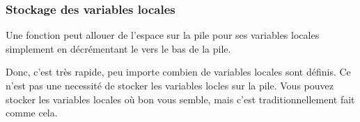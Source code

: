 \subsubsection{Stockage des variables locales}

Une fonction peut allouer de l'espace sur la pile pour ses variables locales
simplement en décrémentant le  vers le
bas de la pile.


Donc, c'est très rapide, peu importe combien de variables locales sont définis.
Ce n'est pas une necessité de stocker les variables locles sur la pile.
Vous pouvez stocker les variables locales où bon vous semble,
mais c'est traditionnellement fait comme cela.

